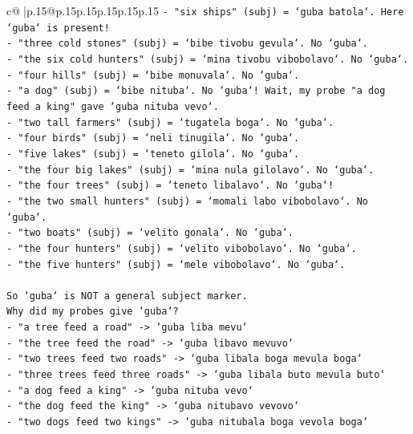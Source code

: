 \documentclass{article}
\begin{document}
{\begin{supertabular}{c@{$\;$}|p{.15\linewidth}@{}p{.15\linewidth}p{.15\linewidth}p{.15\linewidth}p{.15\linewidth}p{.15\linewidth}}
{{{\texttt{{-} "six ships" (subj) = `guba batola`. Here `guba` is present!} \\
\texttt{{-} "three cold stones" (subj) = `bibe tivobu gevula`. No `guba`.} \\
\texttt{{-} "the six cold hunters" (subj) = `mina tivobu vibobolavo`. No `guba`.} \\
\texttt{{-} "four hills" (subj) = `bibe monuvala`. No `guba`.} \\
\texttt{{-} "a dog" (subj) = `bibe nituba`. No `guba`! Wait, my probe "a dog feed a king" gave `guba nituba vevo`.} \\
\texttt{{-} "two tall farmers" (subj) = `tugatela boga`. No `guba`.} \\
\texttt{{-} "four birds" (subj) = `neli tinugila`. No `guba`.} \\
\texttt{{-} "five lakes" (subj) = `teneto gilola`. No `guba`.} \\
\texttt{{-} "the four big lakes" (subj) = `mina nula gilolavo`. No `guba`.} \\
\texttt{{-} "the four trees" (subj) = `teneto libalavo`. No `guba`!} \\
\texttt{{-} "the two small hunters" (subj) = `momali labo vibobolavo`. No `guba`.} \\
\texttt{{-} "two boats" (subj) = `velito gonala`. No `guba`.} \\
\texttt{{-} "the four hunters" (subj) = `velito vibobolavo`. No `guba`.} \\
\texttt{{-} "the five hunters" (subj) = `mele vibobolavo`. No `guba`.} \\
\\ 
\texttt{So `guba` is NOT a general subject marker.} \\
\texttt{Why did my probes give `guba`?} \\
\texttt{{-} "a tree feed a road" {-}> `guba liba mevu`} \\
\texttt{{-} "the tree feed the road" {-}> `guba libavo mevuvo`} \\
\texttt{{-} "two trees feed two roads" {-}> `guba libala boga mevula boga`} \\
\texttt{{-} "three trees feed three roads" {-}> `guba libala buto mevula buto`} \\
\texttt{{-} "a dog feed a king" {-}> `guba nituba vevo`} \\
\texttt{{-} "the dog feed the king" {-}> `guba nitubavo vevovo`} \\
\texttt{{-} "two dogs feed two kings" {-}> `guba nitubala boga vevola boga`} \\
}}}
\end{supertabular}}
\end{document}
